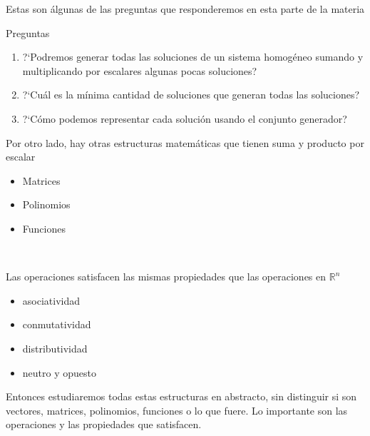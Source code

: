 \documentclass[handout]{beamer} %
\newcommand{\R}{\mathbb R}
\begin{document}
        
        \begin{frame}
        
        Estas son álgunas de las preguntas que responderemos en esta parte de la materia
        \pause
        \begin{block}{Preguntas}
        \begin{enumerate}
         \item ?`Podremos generar todas las soluciones de un sistema homogéneo sumando y multiplicando por escalares algunas pocas soluciones?\pause
         \item ?`Cuál es la mínima cantidad de soluciones que generan todas las soluciones?\pause
         \item ?`Cómo podemos representar cada solución usando el conjunto generador?
        \end{enumerate}
        \end{block}
        
        \end{frame}
        
        \begin{frame}
        
        Por otro lado, hay otras estructuras matemáticas que tienen suma y producto por escalar 
        \begin{itemize}\pause
         \item Matrices\pause
         \item Polinomios\pause
         \item Funciones
        \end{itemize}
        
        \
        
        Las operaciones satisfacen las mismas propiedades que las operaciones en $\R^n$
        \begin{itemize}\pause
         \item asociatividad\pause
         \item conmutatividad\pause
         \item distributividad\pause
         \item neutro y opuesto
        \end{itemize}
        
        
        \end{frame}
        
        \begin{frame}
        Entonces estudiaremos todas estas estructuras en abstracto, sin distinguir si son vectores, matrices, polinomios, funciones o lo que fuere.
        \vskip 1cm\pause
        Lo importante son las operaciones y las propiedades que satisfacen.
        
        
        
        
        \end{frame}  
    
\end{document}
